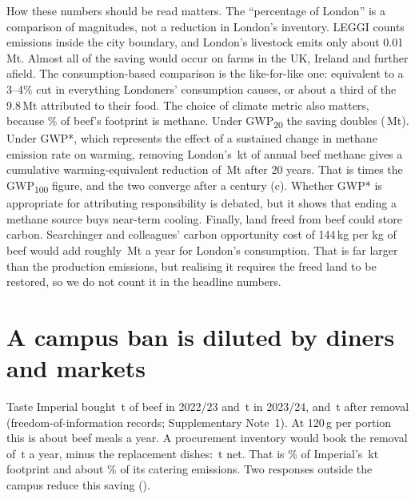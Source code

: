 \documentclass[10pt]{article}
\begin{document}
How these numbers should be read matters. The ``percentage of London'' is a comparison of
magnitudes, not a reduction in London's inventory. LEGGI counts emissions inside the city
boundary, and London's livestock emits only about 0.01\,Mt\cite{leggi2025}. Almost all of the saving
would occur on farms in the UK, Ireland and further afield. The consumption-based comparison is
the like-for-like one: equivalent to a 3--4\% cut in everything Londoners' consumption causes, or
about a third of the 9.8\,Mt attributed to their food\cite{gla2024cbe}. The choice of climate metric
also matters, because \BeefGasChFour\% of beef's footprint is methane. Under GWP\textsubscript{20} the saving
doubles (\GwpTwentyDelta{}\,Mt). Under GWP*, which represents the effect of a sustained change in
methane emission rate on warming\cite{cain2019gwpstar,smith2021gwpstar}, removing London's
\LondonChFourKt{}\,kt of annual beef methane gives a cumulative warming-equivalent reduction of
\CumStarTwenty{}\,Mt after 20 years. That is \CumStarRatioTwenty{} times the GWP\textsubscript{100} figure, and the two
converge after a century (c). Whether GWP* is appropriate for attributing
responsibility is debated\cite{rogelj2019,lynch2020}, but it shows that ending a methane source buys
near-term cooling. Finally, land freed from beef could store carbon. Searchinger and colleagues'
carbon opportunity cost of 144\,kg \COtwoe{} per kg of beef\cite{searchinger2018} would add roughly
\CocLondonMt{}\,Mt a year for London's consumption. That is far larger than the production emissions,
but realising it requires the freed land to be restored\cite{hayek2021}, so we do not count it in the
headline numbers.

\section{A campus ban is diluted by diners and markets}

Taste Imperial bought \FoiBeefTwentyTwo{}\,t of beef in 2022/23 and \FoiBeefTwentyThree{}\,t in 2023/24,
and \FoiBeefTwentyFour{}\,t after removal (freedom-of-information records\cite{imperialfoi};
Supplementary Note~1). At 120\,g per portion this is about \CampusBeefMeals{} beef meals a year. A
procurement inventory would book the removal of \CampusLrGross{}\,t \COtwoe{} a year, minus the
replacement dishes: \CampusLrAcct{}\,t net. That is \CampusPctImperial\% of Imperial's \ImperialTotalKt{}\,kt
footprint\cite{imperial2025annual} and about \CampusPctCatering\% of its catering emissions. Two responses
outside the campus reduce this saving ().
\end{document}
